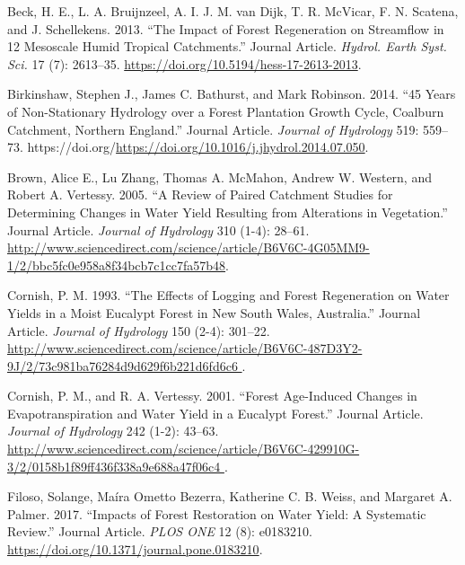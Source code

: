 \documentclass[]{elsarticle} %
\newlength{\cslhangindent}
\newlength{\cslentryspacingunit} %
\newenvironment{CSLReferences}[2] %
 {%
  \setlength{\parindent}{0pt}
  \ifodd #1
  \let\oldpar\par
  \def\par{\hangindent=\cslhangindent\oldpar}
  \fi
  \setlength{\parskip}{#2\cslentryspacingunit}
 }%
 {}
\begin{document}
\hypertarget{refs}{}
\begin{CSLReferences}{1}{0}
\leavevmode{}%
Beck, H. E., L. A. Bruijnzeel, A. I. J. M. van Dijk, T. R. McVicar, F. N. Scatena, and J. Schellekens. 2013. {``The Impact of Forest Regeneration on Streamflow in 12 Mesoscale Humid Tropical Catchments.''} Journal Article. \emph{Hydrol. Earth Syst. Sci.} 17 (7): 2613--35. \url{https://doi.org/10.5194/hess-17-2613-2013}.

\leavevmode{}%
Birkinshaw, Stephen J., James C. Bathurst, and Mark Robinson. 2014. {``45 Years of Non-Stationary Hydrology over a Forest Plantation Growth Cycle, Coalburn Catchment, Northern England.''} Journal Article. \emph{Journal of Hydrology} 519: 559--73. https://doi.org/\url{https://doi.org/10.1016/j.jhydrol.2014.07.050}.

\leavevmode{}%
Brown, Alice E., Lu Zhang, Thomas A. McMahon, Andrew W. Western, and Robert A. Vertessy. 2005. {``A Review of Paired Catchment Studies for Determining Changes in Water Yield Resulting from Alterations in Vegetation.''} Journal Article. \emph{Journal of Hydrology} 310 (1-4): 28--61. \url{http://www.sciencedirect.com/science/article/B6V6C-4G05MM9-1/2/bbc5fc0e958a8f34bcb7c1cc7fa57b48}.

\leavevmode{}%
Cornish, P. M. 1993. {``The Effects of Logging and Forest Regeneration on Water Yields in a Moist Eucalypt Forest in New South Wales, Australia.''} Journal Article. \emph{Journal of Hydrology} 150 (2-4): 301--22. \href{http://www.sciencedirect.com/science/article/B6V6C-487D3Y2-9J/2/73c981ba76284d9d629f6b221d6fd6c6\%20}{http://www.sciencedirect.com/science/article/B6V6C-487D3Y2-9J/2/73c981ba76284d9d629f6b221d6fd6c6 }.

\leavevmode{}%
Cornish, P. M., and R. A. Vertessy. 2001. {``Forest Age-Induced Changes in Evapotranspiration and Water Yield in a Eucalypt Forest.''} Journal Article. \emph{Journal of Hydrology} 242 (1-2): 43--63. \href{http://www.sciencedirect.com/science/article/B6V6C-429910G-3/2/0158b1f89ff436f338a9e688a47f06c4\%20}{http://www.sciencedirect.com/science/article/B6V6C-429910G-3/2/0158b1f89ff436f338a9e688a47f06c4 }.

\leavevmode{}%
Filoso, Solange, Maíra Ometto Bezerra, Katherine C. B. Weiss, and Margaret A. Palmer. 2017. {``Impacts of Forest Restoration on Water Yield: A Systematic Review.''} Journal Article. \emph{PLOS ONE} 12 (8): e0183210. \url{https://doi.org/10.1371/journal.pone.0183210}.


\end{CSLReferences}
\end{document}
